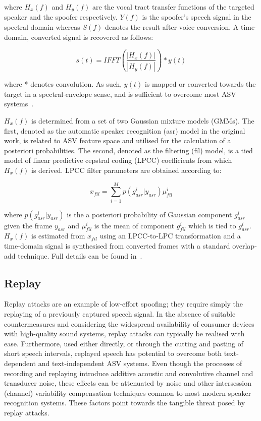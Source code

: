 \noindent where $H_{x}(f)$ and $H_{y}(f)$ are the vocal tract transfer functions of the targeted speaker and the spoofer respectively.  $Y(f)$ is the spoofer's speech signal in the spectral domain whereas $S(f)$ denotes the result after voice conversion. A time-domain, converted  signal is recovered as follows:

\begin{equation}
s(t) = IFFT(\frac{\left|H_{x}(f)\right|}{\left|H_{y}(f)\right|})*y(t)
\label{eq:conversioneq_t}
\end{equation}

\noindent where * denotes convolution. As such, $y(t)$ is mapped or converted towards the target in a spectral-envelope sense, and is sufficient to overcome most ASV systems~\cite{Matrouf2005, Bonastre2006}. 

$H_x(f)$ is determined from a set of two Gaussian mixture models (GMMs).  The first, denoted as the automatic speaker recognition (asr) model in the original work, is related to ASV feature space and utilised for the calculation of a posteriori probabilities.  The second, denoted as the filtering (fil) model, is a tied model of linear predictive cepstral coding (LPCC) coefficients from which $H_x(f)$ is derived.  LPCC filter parameters are obtained according to:

\begin{equation}
x_{fil} = \sum\limits_{i=1}^{M}p(g_{asr}^{i}|y_{asr}) \mu_{fil}^{i}
\label{eq:EMit}
\end{equation}

\noindent where $p(g_{asr}^{i}|y_{asr})$ is the a posteriori probability of Gaussian component $g_{asr}^{i}$ given the frame $y_{asr}$ and $\mu_{fil}^{i}$ is the mean of component $g_{fil}^{i}$ which is tied to $g_{asr}^{i}$.  $H_{x}(f)$ is estimated from $x_{fil}$ using an LPCC-to-LPC transformation and a time-domain signal is synthesised from converted frames with a standard overlap-add technique. Full details can be found in~\cite{Matrouf2005, Bonastre2006, Bonastre2007}.


\subsection{Replay}
\label{ssec:replay}


Replay attacks are an example of low-effort spoofing; they require simply the replaying of a previously captured speech signal.  
In the absence of suitable countermeasures and considering the widespread availability of consumer devices with high-quality sound systems, replay attacks can typically be realised with ease.  Furthermore, used either directly, or through the cutting and pasting of short speech intervals, replayed speech has potential to overcome both text-dependent and text-independent ASV systems.  Even though the processes of recording and replaying introduce additive acoustic and convolutive channel and transducer noise, these effects can be attenuated by noise and other intersession (channel) variability compensation techniques common to most modern speaker recognition systems.  These factors point towards the tangible threat posed by replay attacks.

